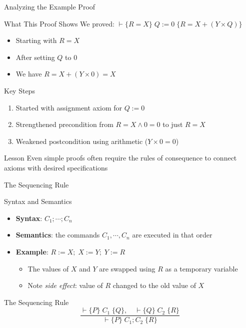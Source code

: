 \begin{frame}{Analyzing the Example Proof}
    \begin{block}{What This Proof Shows}
        We proved: $\vdash \{R=X\} \; Q:=0 \; \{R=X+(Y \times Q)\}$
        \begin{itemize}
            \item Starting with $R = X$
            \item After setting $Q$ to $0$
            \item We have $R = X + (Y \times 0) = X$
        \end{itemize}
    \end{block}
    
    \begin{block}{Key Steps}
        \begin{enumerate}
            \item Started with assignment axiom for $Q := 0$
            \item Strengthened precondition from $R=X \wedge 0=0$ to just $R=X$
            \item Weakened postcondition using arithmetic ($Y \times 0 = 0$)
        \end{enumerate}
    \end{block}
    
    \begin{block}{Lesson}
        Even simple proofs often require the rules of consequence to connect axioms with desired specifications
    \end{block}
\end{frame}

\begin{frame}{The Sequencing Rule}
    \begin{block}{Syntax and Semantics}
        \begin{itemize}
            \item \textbf{Syntax}: $C_1; \cdots; C_n$
            \item \textbf{Semantics}: the commands $C_1, \cdots, C_n$ are executed in that order
            \item \textbf{Example}: $R:=X; \; X:=Y; \; Y:=R$
            \begin{itemize}
                \item The values of $X$ and $Y$ are swapped using $R$ as a temporary variable
                \item Note \emph{side effect}: value of $R$ changed to the old value of $X$
            \end{itemize}
        \end{itemize}
    \end{block}
    
    \begin{block}{The Sequencing Rule}
        \[ \frac{\vdash \{P\} \; C_1 \; \{Q\}, \quad \vdash \{Q\} \; C_2 \; \{R\}}{\vdash \{P\} \; C_1; C_2 \; \{R\}} \]
    \end{block}
\end{frame}

